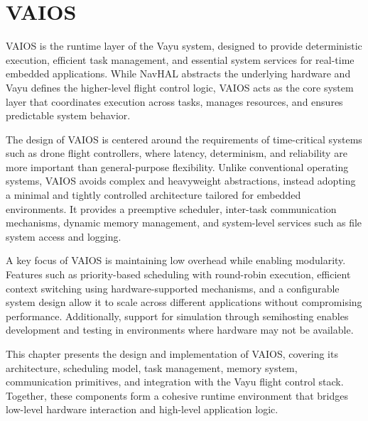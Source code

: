 \chapter{VAIOS}
\label{chap:vaios}

VAIOS is the runtime layer of the Vayu system, designed to provide deterministic execution, efficient task management, and essential system services for real-time embedded applications. While NavHAL abstracts the underlying hardware and Vayu defines the higher-level flight control logic, VAIOS acts as the core system layer that coordinates execution across tasks, manages resources, and ensures predictable system behavior.

The design of VAIOS is centered around the requirements of time-critical systems such as drone flight controllers, where latency, determinism, and reliability are more important than general-purpose flexibility. Unlike conventional operating systems, VAIOS avoids complex and heavyweight abstractions, instead adopting a minimal and tightly controlled architecture tailored for embedded environments. It provides a preemptive scheduler, inter-task communication mechanisms, dynamic memory management, and system-level services such as file system access and logging.

A key focus of VAIOS is maintaining low overhead while enabling modularity. Features such as priority-based scheduling with round-robin execution, efficient context switching using hardware-supported mechanisms, and a configurable system design allow it to scale across different applications without compromising performance. Additionally, support for simulation through semihosting enables development and testing in environments where hardware may not be available.

This chapter presents the design and implementation of VAIOS, covering its architecture, scheduling model, task management, memory system, communication primitives, and integration with the Vayu flight control stack. Together, these components form a cohesive runtime environment that bridges low-level hardware interaction and high-level application logic.












